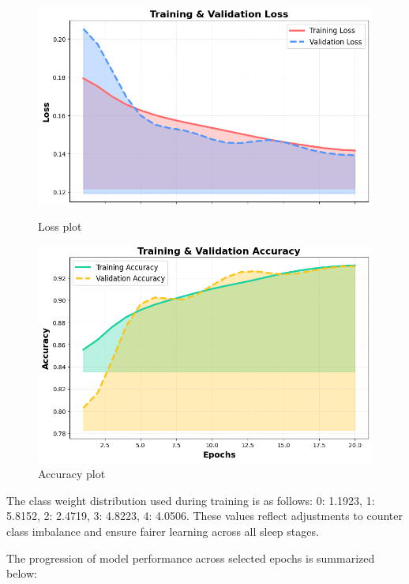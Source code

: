 \begin{figure}[htbp]
	\centering
	\begin{minipage}[b]{0.45\linewidth}
		\includegraphics[width=\linewidth]{img/paper_3/loss plot}
		\caption{Loss plot}
		\label{fig:loss-plot}
	\end{minipage}
	\hfill
	\begin{minipage}[b]{0.45\linewidth}
		\includegraphics[width=\linewidth]{img/paper_3/accuracy plot}
		\caption{Accuracy plot}
		\label{fig:accuracy-plot}
	\end{minipage}
\end{figure}

The class weight distribution used during training is as follows: 0: 1.1923, 1: 5.8152, 2: 2.4719, 3: 4.8223, 4: 4.0506. These values reflect adjustments to counter class imbalance and ensure fairer learning across all sleep stages.

The progression of model performance across selected epochs is summarized below:

